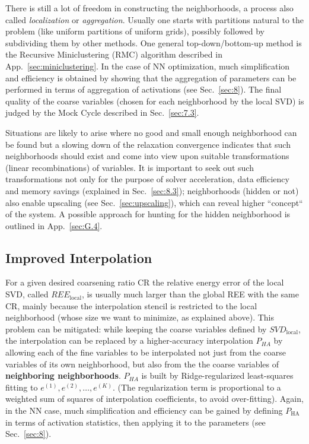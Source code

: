 \documentclass{article} %
\begin{document}
There is still a lot of freedom in constructing the neighborhoods, a process also called {\it localization} or {\it aggregation}. Usually one starts with partitions natural to the problem (like uniform partitions of uniform grids), possibly followed by subdividing them by other methods. One general top-down/bottom-up method is the Recursive Miniclustering (RMC) algorithm described in App.~\ref{sec:miniclustering}. In the case of NN optimization, much simplification and efficiency is obtained by showing that the aggregation of parameters can be performed in terms of aggregation of activations (see Sec.~\ref{sec:8}). The final quality of the coarse variables (chosen for each neighborhood by the local SVD) is judged by the Mock Cycle described in Sec.~\ref{sec:7.3}.

Situations are likely to arise where no good and small enough neighborhood can be found but a slowing down of the relaxation convergence indicates that such neighborhoods should exist and come into view upon suitable transformations (linear recombinations) of variables. It is important to seek out such transformations not only for the purpose of solver acceleration, data efficiency and memory savings (explained in Sec.~\ref{sec:8.3}); neighborhoods (hidden or not) also enable upscaling (see Sec.~\ref{sec:upscaling}), which can reveal higher ``concept`` of the system. A possible approach for hunting for the hidden neighborhood is outlined in App.~\ref{sec:G.4}.

\subsection{Improved Interpolation}
\label{sec:improved_coarsening}

For a given desired coarsening ratio CR the relative energy error of the local SVD, called $REE_{\text{local}}$, is usually much larger than the global REE with the same CR, mainly because the interpolation stencil is restricted to the local neighborhood (whose size we want to minimize, as explained above). This problem can be mitigated: while keeping the coarse variables defined by $SVD_{\text{local}}$, the interpolation can be replaced by a higher-accuracy interpolation $P_{HA}$ by allowing each of the fine variables to be interpolated not just from the coarse variables of its own neighborhood, but also from the the coarse variables of \textbf{neighboring neighborhoods}. $P_{HA}$ is built by Ridge-regularized least-squares fitting to $e^{(1)}, e^{(2)}, \dots, e^{(K)}$. (The regularization term is proportional to a weighted sum of squares of interpolation coefficients, to avoid over-fitting). Again, in the NN case, much simplification and efficiency can be gained by defining $P_{\text{HA}}$ in terms of activation statistics, then applying it to the parameters (see Sec.~\ref{sec:8}).
\end{document}
